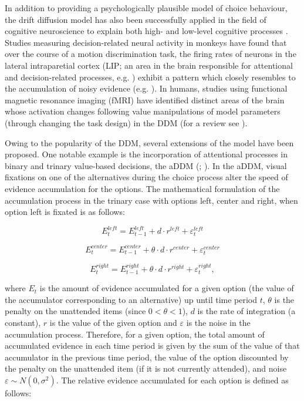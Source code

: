 \documentclass[11pt,a4paper]{article}
\begin{document}
In addition to providing a psychologically plausible model of choice behaviour, the drift diffusion model has also been successfully applied in the field of cognitive neuroscience to explain both high- and low-level cognitive processes \cite{Forstmann2016}. Studies measuring decision-related neural activity in monkeys have found that over the course of a motion discrimination task, the firing rates of neurons in the lateral intraparetial cortex (LIP; an area in the brain responsible for attentional and decision-related processes, e.g. ) exhibit a pattern which closely resembles to the accumulation of noisy evidence (e.g. ). In humans, studies using functional magnetic resonance imaging (fMRI) have identified distinct areas of the brain whose activation changes following value manipulations of model parameters (through changing the task design) in the DDM (for a review see ). 

Owing to the popularity of the DDM, several extensions of the model have been proposed. One notable example is the incorporation of attentional processes in binary and trinary value-based decisions, the aDDM (; ). In the aDDM, visual fixations on one of the alternatives during the choice process alter the speed of evidence accumulation for the options. The mathematical formulation of the accumulation process in the trinary case with options left, center and right, when option left is fixated is as follows:

\begin{equation} \label{Evidence1}
E_{t}^{left}=E_{t-1}^{left}+d\cdot r^{left}+\varepsilon_{t}^{left}
\end{equation}

\begin{equation} \label{Evidence2}
E_{t}^{center}=E_{t-1}^{center}+\theta\cdot d\cdot r^{center}+\varepsilon_{t}^{center}
\end{equation}


\begin{equation} \label{Evidence3}
E_{t}^{right}=E_{t-1}^{right}+\theta\cdot d\cdot r^{right}+\varepsilon_{t}^{right},
\end{equation}

where $E_{t}$ is the amount of evidence accumulated for a given option
(the value of the accumulator corresponding to an alternative) up
until time period $t$, $\theta$ is the penalty on the unattended
items (since $0<\theta<1$), $d$ is the rate of integration (a constant),
$r$ is the value of the given option and $\varepsilon$ is the noise
in the accumulation process. Therefore, for a given option, the total
amount of accumulated evidence in each time period is given by the
sum of the value of that accumulator in the previous time period,
the value of the option discounted by the penalty on the unattended
item (if it is not currently attended), and noise $\varepsilon\sim N(0,\sigma^{2})$.
The relative evidence accumulated for each option is defined as follows:
\end{document}
